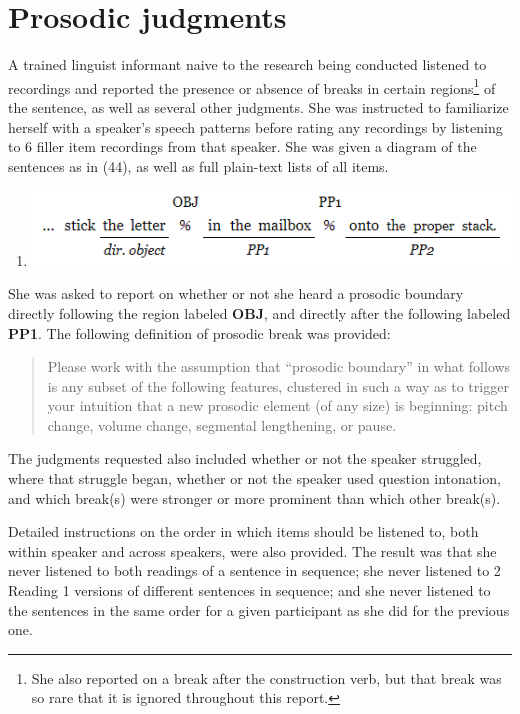 \documentclass[12pt,oneside]{book}
\providecommand{\tightlist}{%
  \setlength{\itemsep}{0pt}\setlength{\parskip}{0pt}}
\let\rmarkdownfootnote\footnote%
\def\footnote{\protect\rmarkdownfootnote}
\begin{document}
\hypertarget{sita}{%
\section{Prosodic judgments}\label{sita}}

A trained linguist informant naive to the research being conducted listened to recordings and reported the presence or absence of breaks in certain regions\footnote{She also reported on a break after the construction verb, but that break was so rare that it is ignored throughout this report.} of the sentence, as well as several other judgments. She was instructed to familiarize herself with a speaker's speech patterns before rating any recordings by listening to 6 filler item recordings from that speaker. She was given a diagram of the sentences as in (44), as well as full plain-text lists of all items.

\begin{enumerate}
\def\labelenumi{(\arabic{enumi})}
\setcounter{enumi}{43}
\tightlist
\item
  \includegraphics{breakpos.png}
\end{enumerate}

She was asked to report on whether or not she heard a prosodic boundary directly following the region labeled \textbf{OBJ}, and directly after the following labeled \textbf{PP1}. The following definition of prosodic break was provided:

\begin{quote}
Please work with the assumption that ``prosodic boundary'' in what follows is any subset of the following features, clustered in such a way as to trigger your intuition that a new prosodic element (of any size) is beginning: pitch change, volume change, segmental lengthening, or pause.
\end{quote}

The judgments requested also included whether or not the speaker struggled, where that struggle began, whether or not the speaker used question intonation, and which break(s) were stronger or more prominent than which other break(s).

Detailed instructions on the order in which items should be listened to, both within speaker and across speakers, were also provided. The result was that she never listened to both readings of a sentence in sequence; she never listened to 2 Reading 1 versions of different sentences in sequence; and she never listened to the sentences in the same order for a given participant as she did for the previous one.
\end{document}
